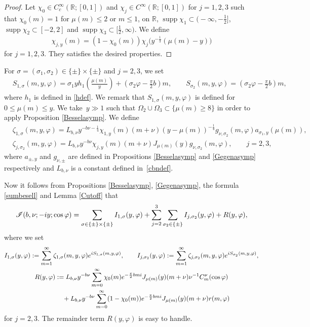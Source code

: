 \documentclass[10pt,a4paper]{article}
\numberwithin{equation}{section}
\def\R{\mathbb{R}}%
\DeclareMathOperator{\supp}{supp}%
\def\f{\varphi}
\def\m{\mu}
\def\n{\nu}
\def\s{\sigma}
\def\z{\zeta}
\newcommand{\sI}{\mathscr{I}}
\begin{document}
\begin{proof}
Let $\chi_0\in C_c^{\infty}(\R;[0,1])$ and $\chi_j\in C^{\infty}(\R;[0,1])$ for $j=1,2,3$ such that $\chi_0(m)=1$ for $\m(m)\leq 2$ or $m\leq 1$,  on $\R$, $\supp \chi_1\subset \bigl(-\infty,-\frac{1}{2}\bigr]$, $\supp \chi_2\subset [-2,2]$ and $\supp \chi_3\subset \bigl[\frac{1}{2},\infty\bigr)$. We define
\begin{align*}
\chi_{j,y}(m)=(1-\chi_0(m))\chi_j\bigl(y^{-\frac{1}{3}}(\m(m)-y)\bigr)
\end{align*}
for $j=1,2,3$.
They satisfies the desired properties.
\end{proof}

For $\s=(\s_1,\s_2)\in \{\pm\}\times \{\pm\}$ and $j=2,3$, we set
\begin{align*}
&S_{1,\s}(m,y,\f)=\s_1yh_1\left(\frac{\m(m)}{y}\right) +\left(\s_2\f-\frac{\pi}{2}b\right)m,\qquad S_{\s_2}(m,y,\f)=\left(\s_2\f-\frac{\pi}{2}b\right)m,
\end{align*}
where $h_1$ is defined in \eqref{hdef}. We remark that $S_{1,\sigma}(m,y,\f)$ is defined for $0\le \m(m)\le y$.
We take~${y\gg 1}$ such that $\Omega_2\cup \Omega_3\subset \{\m(m)\geq 8\}$ in order to apply Proposition \ref{Besselasymp}.
We define
\begin{align*}
&\z_{1,\s}(m,y,\f)=L_{b,\n}y^{-b\n-\frac{1}{4}}\chi_{1,y}(m)(m+\n)(y-\m(m))^{-\frac{1}{4}}g_{\n,\s_2}(m,\f)a_{\s_1,y}(\m(m)),\\
&\z_{j,\s_2}(m,y,\f)=L_{b,\n}y^{-b\n}\chi_{j,y}(m)(m+\n)J_{\m(m)}(y)g_{\n,\s_2}(m,\f),\qquad j=2,3,
\end{align*}
where $a_{\pm,y}$ and $g_{\n,\pm}$ are defined in Propositions \ref{Besselasymp} and \ref{Gegenasymp} respectively and $L_{b,\n}$ is a constant defined in~\eqref{cbndef}.

Now it follows from Propositions \ref{Besselasymp}, \ref{Gegenasymp}, the formula \eqref{sumbesell} and Lemma \ref{Cutoff} that
\begin{align}\label{sIdecom}
\sI(b,\nu;- {\rm i}y;\cos\f)=\sum_{\s\in \{\pm\}\times \{\pm\}}I_{1,\s}(y,\f)+\sum_{j=2}^3\sum_{\s_2\in \{\pm\}}I_{j,\s_2}(y,\f)+R(y,\f),
\end{align}
where we set
\begin{gather*}
I_{1,\s}(y,\f):=\sum_{m=1}^{\infty}\z_{1,\s}(m,y,\f){\rm e}^{{\rm i}S_{1,\s}(m,y,\f)},\qquad I_{j,\s_2}(y,\f):=\sum_{m=1}^{\infty}\z_{j,\s_2}(m,y,\f){\rm e}^{{\rm i}S_{\s_2}(m,y,\f)},\\
R(y,\f):=L_{b,\n}y^{-b\n}\sum_{m=0}^{\infty}\chi_0(m){\rm e}^{-\frac{\pi}{2}bm{\rm i}}J_{\m(m)}(y)(m+\nu)\n^{-1}C^{\nu}_m(\cos\f)\\
\phantom{R(y,\f):=}{}+L_{b,\n}y^{-b\n}\sum_{m=0}^{\infty}
(1-\chi_0(m))
{\rm e}^{-\frac{\pi}{2}bm{\rm i}}J_{\m(m)}(y)(m+\nu)r(m,\f)
\end{gather*}
for $j=2,3$.
The remainder term $R(y,\f)$ is easy to handle.
\end{document}
